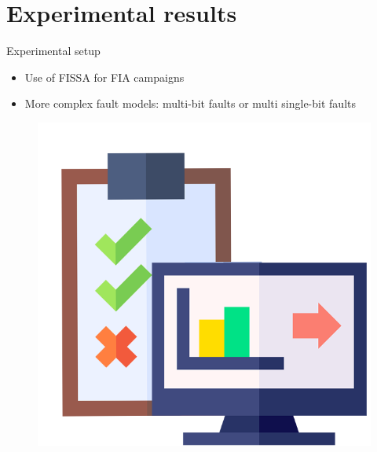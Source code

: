 \section{Experimental results}

\begin{frame}{Experimental setup}
    \begin{minipage}[c]{0.7\linewidth}
        \begin{block}{}
            \begin{itemize}
                \item Use of FISSA for FIA campaigns
                \item More complex fault models: multi-bit faults or multi single-bit faults
            \end{itemize}
        \end{block}
    \end{minipage}\hfill%
    \begin{minipage}[c]{0.3\linewidth}
        \begin{figure}
            \centering
            \includegraphics[width=.75\textwidth]{src/5_results/img/experimental.png}
        \end{figure}
    \end{minipage}
\end{frame}

